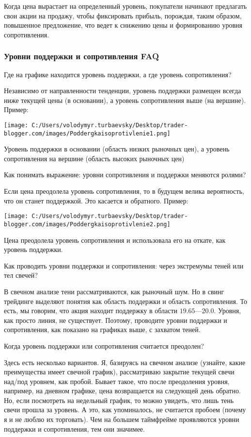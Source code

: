 \documentclass[a5paper]{article}
\begin{document}
Когда цена вырастает на определенный уровень, покупатели начинают
предлагать свои акции на продажу, чтобы фиксировать прибыль,
порождая, таким образом, повышенное предложение, что ведет к снижению
цены и формированию уровня сопротивления.

\subsubsection{Уровни поддержки и сопротивления FAQ}


Где на графике находится уровень поддержки, а где уровень сопротивления?

Независимо от направленности тенденции, уровень поддержки размещен
всегда ниже текущей цены (в основании), а уровень сопротивления выше
(на вершине). Пример:

\texttt{[image: C:/Users/volodymyr.turbaevsky/Desktop/trader-blogger.com/images/Poddergkaisoprotivlenie1.png]}

Уровень поддержки в основании (область низких рыночных цен), а уровень сопротивления на вершине (область высоких рыночных цен)

Как понимать выражение: уровни сопротивления и поддержки меняются ролями?

Если цена преодолела уровень сопротивления, то в будущем велика
вероятность, что он станет поддержкой. Это касается и
обратного. Пример:

\texttt{[image: C:/Users/volodymyr.turbaevsky/Desktop/trader-blogger.com/images/Poddergkaisoprotivlenie2.png]}

Цена преодолела уровень сопротивления и использовала его на откате, как уровень поддержки.

Как проводить уровни поддержки и сопротивления: через экстремумы теней или тел свечей?

В свечном анализе тени  рассматриваются, как рыночный шум. Но в свинг трейдинге выделяют понятия как область поддержки и область сопротивления. То есть, мы говорим, что акция находит поддержку в области $19.65 — $20.0. Уровня, как просто линия, не существует. Поэтому, проводите уровни поддержки и сопротивления, как показано на графиках выше, с захватом теней.

Когда уровень поддержки или сопротивления считается преодолен?

Здесь есть несколько вариантов. Я, базируясь на свечном анализе
(узнайте, какие преимущества имеет свечной график), рассматриваю
закрытие текущей свечи над/под уровнем, как пробой. Бывает такое, что
после преодоления уровня, например, на дневном графике, цена
возвращается на следующей день обратно. Но, если посмотреть на
недельный график, то можно увидеть, что лишь тень свечи прошла за
уровень. А это, как упоминалось, не считается пробоем (почему я и не
люблю их торговать). Чем на большем таймфрейме проявляются уровни
поддержки и сопротивления, тем они значимее.
\end{document}

